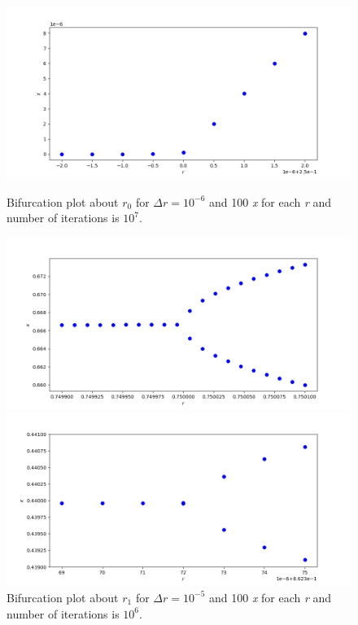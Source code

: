 \documentclass[12pt, a4paper]{article}
\begin{document}
	\begin{figure}[h]
		\centering
		\begin{minipage}[b]{0.4\textwidth}
		\includegraphics[width=\textwidth]{../q4/q4_0.249998_0.250002_9_100_10000000.jpg}
		\caption{Bifurcation plot about $r_0$ for $\Delta r=10^{-6}$ and 100 \textit{x} for each 
			\textit{r} and number of iterations is $10^7$.}
		\label{fig:q4_r0}
		\end{minipage}
		\hfill
		\begin{minipage}[b]{0.4\textwidth}
		\includegraphics[width=\textwidth]{../q4/q4_0.7499_0.7501_20_100_1000000.jpg}
		\caption{Bifurcation plot about $r_1$ for $\Delta r=10^{-5}$ and 100 \textit{x} for each 
			\textit{r} and number of iterations is $10^6$.}
		\label{fig:q4_r1}
		\end{minipage}
		\hfill
		\begin{minipage}[b]{0.4\textwidth}
		\includegraphics[width=\textwidth]{../q4/q4_0.8623689999999999_0.862375_7_100_1000000.jpg}

\end{minipage}
\end{figure}
\end{document}
